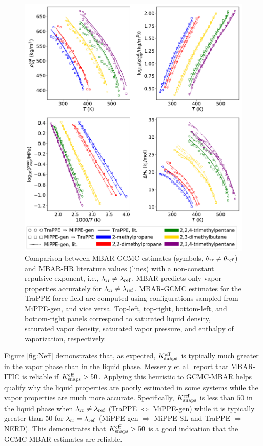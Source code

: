 \documentclass[journal=jced,manuscript=article]{achemso}
\begin{document}
	\begin{figure}[htb!]
		\centering
		\includegraphics[width=6.4in]{refFF_to_rrFF_lam_12to16.pdf}
		\caption{Comparison between MBAR-GCMC estimates (symbols, $\theta_{\rm rr} \neq \theta_{\rm ref}$) and MBAR-HR literature values (lines) with a non-constant repulsive exponent, i.e., $\lambda_{\rm rr} \neq \lambda_{\rm ref}$. MBAR predicts only vapor properties accurately for $\lambda_{\rm rr} \neq \lambda_{\rm ref}$. MBAR-GCMC estimates for the TraPPE force field are computed using configurations sampled from MiPPE-gen, and vice versa. Top-left, top-right, bottom-left, and bottom-right panels correspond to saturated liquid density, saturated vapor density, saturated vapor pressure, and enthalpy of vaporization, respectively.}
		\label{fig:refFF_to_rrFF_lam12to16}
	\end{figure}
Figure \ref{fig:Neff} demonstrates that, as expected, $K_{\rm snaps}^{\rm eff}$ is typically much greater in the vapor phase than in the liquid phase. Messerly et al.~report that MBAR-ITIC is reliable if $K_{\rm snaps}^{\rm eff} > 50$. Applying this heuristic to GCMC-MBAR helps qualify why the liquid properties are poorly estimated in some systems while the vapor properties are much more accurate. Specifically, $K_{\rm snaps}^{\rm eff}$ is less than $50$ in the liquid phase when $\lambda_{\rm rr} \neq \lambda_{\rm ref}$ (TraPPE $\Leftrightarrow$ MiPPE-gen) while it is typically greater than 50 for $\lambda_{\rm rr} = \lambda_{\rm ref}$ (MiPPE-gen $\Rightarrow$ MiPPE-SL and TraPPE $\Rightarrow$ NERD). This demonstrates that $K_{\rm snaps}^{\rm eff} > 50$ is a good indication that the GCMC-MBAR estimates are reliable.
\end{document}
